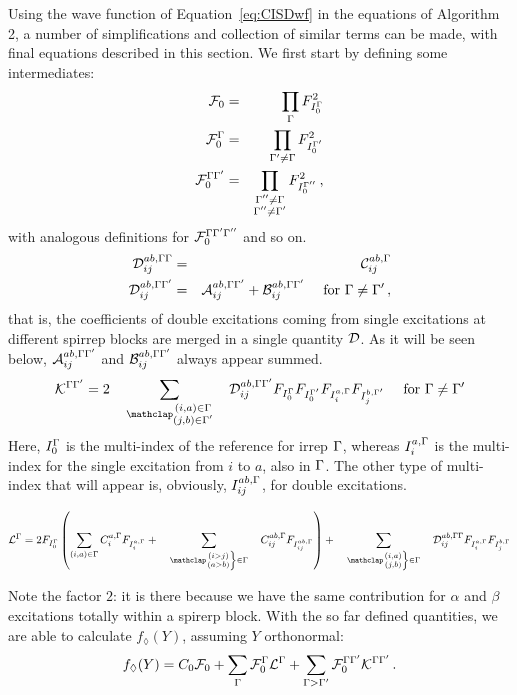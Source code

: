 \documentclass[a4paper,11pt]{article}
\begin{document}
Using the wave function of Equation~\eqref{eq:CISDwf} in the equations of Algorithm 2, a number of simplifications and collection of similar terms can be made, with final equations described in this section.
We first start by defining some intermediates:
\begin{eqnarray}
  \mathcal{F}_0 &=& \prod_{\Gamma} F_{I_0^{\Gamma}}^2\\
  \mathcal{F}_0^{\Gamma} &=& \prod_{{\Gamma'} \ne \Gamma} F_{I_0^{\Gamma'}}^2\\
  \mathcal{F}_0^{\Gamma{\ensuremath{\Gamma'}}} &=&
    \prod_{\substack{{{\Gamma''} \ne \Gamma}\\{{\Gamma''} \ne {\ensuremath{\Gamma'}}}}} F_{I_0^{{\Gamma''}}}^2\,,
\end{eqnarray}
with analogous definitions for $\mathcal{F}_0^{\Gamma{\ensuremath{\Gamma'}}{\ensuremath{\Gamma''}}}$ and so on.
\begin{eqnarray}
  \mathcal{D}_{ij}^{ab, \Gamma\Gamma} &=& \mathcal{C}_{ij}^{ab, \Gamma}\\
  \mathcal{D}_{ij}^{ab, \Gamma{\ensuremath{\Gamma'}}} &=& \mathcal{A}_{ij}^{ab, \Gamma{\ensuremath{\Gamma'}}} + \mathcal{B}_{ij}^{ab, \Gamma{\ensuremath{\Gamma'}}}
                            \quad\text{ for }\Gamma \ne {\ensuremath{\Gamma'}}\,,
\end{eqnarray}
that is, the coefficients of double excitations coming from single excitations at different spirrep blocks are merged in a single quantity $\mathcal{D}$.
As it will be seen below, $\mathcal{A}_{ij}^{ab, \Gamma{\ensuremath{\Gamma'}}}$ and $\mathcal{B}_{ij}^{ab, \Gamma{\ensuremath{\Gamma'}}}$ always appear summed.
\begin{equation}
  \label{eq:K_for_CISD}
  \mathcal{K}^{\irp\irpP} = 2 \sumijabmix \Dmix_{ij}^{ab, \irp\irpP}
  F_{I_0^\irp} F_{I_0^\irpP} F_{I_i^{a,\irp}} F_{I_j^{b,\irpP}}
  \quad\text{ for }\irp \ne \irpP
\end{equation}
Here, ${I_0^{\Gamma}}$ is the multi-index of the reference for irrep $\Gamma$, whereas ${I_i^{a,\Gamma}}$ is the multi-index for the single excitation from $i$ to $a$, also in $\Gamma$.
The other type of multi-index that will appear is, obviously, ${I_{ij}^{ab,\Gamma}}$, for double excitations.

\begin{equation}
  \label{eq:L_for_CISD}
  \mathcal{L}^\irp = 2 F_{I_0^\irp}
  \left(
    \sum_{(i,a) \in \irp} C_{i}^{a, \irp} F_{I_i^{a,\irp}}
    + \sumijabrestr C_{ij}^{ab, \irp}  F_{I_{ij}^{ab,\irp}}
  \right)
  + \sumijabfull \Dmix_{ij}^{ab, \irp\irp}
  F_{I_i^{a,\irp}} F_{I_j^{b,\irp}}
\end{equation}

Note the factor $2$: it is there because we have the same contribution for $\alpha$ and $\beta$ excitations totally within a spirerp block.
With the so far defined quantities, we are able to calculate $f_\lozenge(Y)$, assuming $Y$ orthonormal:
\begin{equation}
  \label{eq:f_for_CISD}
  f_\lozenge(Y) = C_0 \mathcal{F}_0
  + \sum_{\Gamma} \mathcal{F}_0^{\Gamma}\mathcal{L}^{\Gamma}
  + \sum_{\Gamma > {\Gamma'}} \mathcal{F}_0^{\Gamma{\ensuremath{\Gamma'}}}\mathcal{K}^{\Gamma{\ensuremath{\Gamma'}}}\,.
\end{equation}
\end{document}
